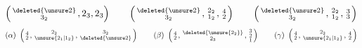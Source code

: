 \[
\left(\begin{smallmatrix}\deleted{\unsure2}\\3_2\end{smallmatrix},2_3,2_3\right)\qquad \left(\begin{smallmatrix}\deleted{\unsure2}\\3_2\end{smallmatrix},\begin{smallmatrix}2_2\\1_2\end{smallmatrix},\begin{smallmatrix}4\\2\end{smallmatrix}\right)\qquad \left(\begin{smallmatrix}\deleted{\unsure2}\\3_2\end{smallmatrix},\begin{smallmatrix}2_2\\1_2\end{smallmatrix},\begin{smallmatrix}3\\3\end{smallmatrix}\right)
\]
\[
(\alpha)\ \left(\begin{smallmatrix}4\\2\end{smallmatrix},\begin{smallmatrix}2_2\\\unsure{2_1|1_2}\end{smallmatrix},\begin{smallmatrix}3_2\\\deleted{\unsure2}\end{smallmatrix}\right)\qquad (\beta)\ \left(\begin{smallmatrix}4\\2\end{smallmatrix},\begin{smallmatrix}\deleted{\unsure{2_2}}\\2_3\end{smallmatrix},\begin{smallmatrix}3\\2\\1\end{smallmatrix}\right)\qquad (\gamma)\ \left(\begin{smallmatrix}4\\2\end{smallmatrix},\begin{smallmatrix}2_2\\\unsure{2_1|1_2}\end{smallmatrix},\begin{smallmatrix}4\\2\end{smallmatrix}\right)
\]

